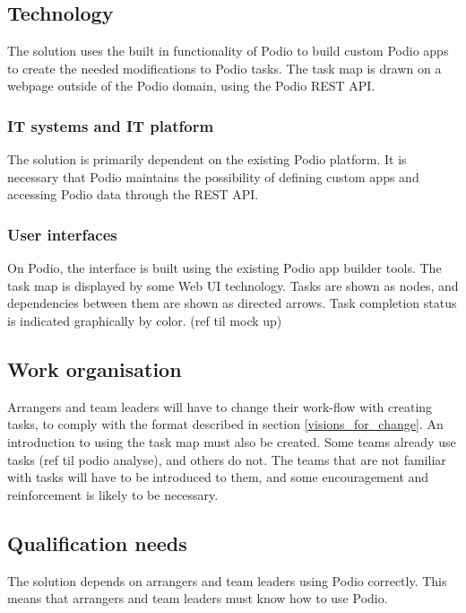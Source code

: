 \subsection{Technology}
\label{sub:technology}
The solution uses the built in functionality of Podio to build custom Podio apps to create the needed modifications to Podio tasks. The task map is drawn on a webpage outside of the Podio domain, using the Podio REST API.

\subsubsection{IT systems and IT platform}
The solution is primarily dependent on the existing Podio platform. It is necessary that Podio maintains the possibility of defining custom apps and accessing Podio data through the REST API.

\subsubsection{User interfaces}
On Podio, the interface is built using the existing Podio app builder tools. The task map is displayed by some Web UI technology. Tasks are shown as nodes, and dependencies between them are shown as directed arrows. Task completion status is indicated graphically by color. (ref til mock up)

\subsection{Work organisation}
\label{sub:work_organisation}
Arrangers and team leaders will have to change their work-flow with creating tasks, to comply with the format described in section \ref{visions_for_change}. An introduction to using the task map must also be created. Some teams already use tasks (ref til podio analyse), and others do not. The teams that are not familiar with tasks will have to be introduced to them, and some encouragement and reinforcement is likely to be necessary.

\subsection{Qualification needs}
\label{sub:qualification_needs}
The solution depends on arrangers and team leaders using Podio correctly. This means that arrangers and team leaders must know how to use Podio.

